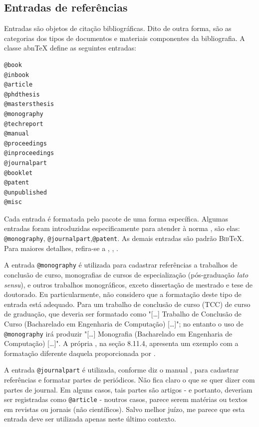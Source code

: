 \begin{apendicesenv}
\section{Entradas de referências}
\label{sec:entradasRefs}

Entradas são objetos de citação bibliográficas. Dito de outra forma, são as categorias dos tipos de documentos e materiais componentes da bibliografia. A classe abn\TeX{} define as seguintes entradas:


\begin{verbatim}
@book
@inbook
@article
@phdthesis
@mastersthesis
@monography
@techreport
@manual
@proceedings
@inproceedings
@journalpart
@booklet
@patent
@unpublished
@misc
\end{verbatim}

Cada entrada é formatada pelo pacote  de uma forma específica. Algumas entradas foram introduzidas especificamente para atender à norma , são elas: \verb|@monography|, \verb|@journalpart|,\verb|@patent|. As demais entradas são padrão \textsc{Bib}\TeX{}. Para maiores detalhes, refira-se a , , .

A entrada \verb|@monography| é utilizada para cadastrar referências a trabalhos de conclusão de curso, monografias de cursos de especialização (pós-graduação \textit{lato sensu}), e outros trabalhos monográficos, exceto dissertação de mestrado e tese de doutorado. Eu particularmente, não considero que a formatação deste tipo de entrada está adequado. Para um trabalho de conclusão de curso (TCC) de curso de graduação, que deveria ser formatado como "[\ldots] Trabalho de Conclusão de Curso (Bacharelado em Engenharia de Computação) [\ldots]"{}; no entanto o uso de \verb|@monography| irá produzir "[\ldots] Monografia (Bacharelado em Engenharia de Computação) [\ldots]"{}. A própria  , na seção 8.11.4, apresenta um exemplo com a formatação diferente daquela proporcionada por .

A entrada \verb|@journalpart| é utilizada, conforme diz o manual \cite{abnTeX22014d}, para cadastrar referências e formatar partes de periódicos. Não fica claro o que se quer dizer com partes de journal. Em alguns casos, tais partes são artigos - e portanto, deveriam ser registradas como \verb|@article| - noutros casos, parece serem matérias ou textos em revistas ou jornais (não científicos). Salvo melhor juízo, me parece que esta entrada deve ser utilizada apenas neste último contexto.


\end{apendicesenv}
